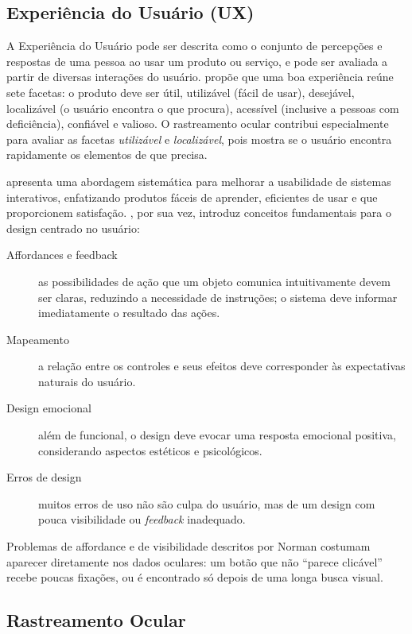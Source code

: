 \documentclass[sigconf, nonacm, language=english, language=portuguese, natbib=false]{acmart}
\begin{document}
\subsection{Experiência do Usuário (UX)}

A Experiência do Usuário pode ser descrita como o conjunto de percepções e respostas de uma pessoa ao usar um produto ou serviço, e pode ser avaliada a partir de diversas interações do usuário. \textcite{morville2004ux} propõe que uma boa experiência reúne sete facetas: o produto deve ser útil, utilizável (fácil de usar), desejável, localizável (o usuário encontra o que procura), acessível (inclusive a pessoas com deficiência), confiável e valioso. O rastreamento ocular contribui especialmente para avaliar as facetas \emph{utilizável} e \emph{localizável}, pois mostra se o usuário encontra rapidamente os elementos de que precisa.

\textcite{nielsen1993usability} apresenta uma abordagem sistemática para melhorar a usabilidade de sistemas interativos, enfatizando produtos fáceis de aprender, eficientes de usar e que proporcionem satisfação. \textcite{norman2002design}, por sua vez, introduz conceitos fundamentais para o design centrado no usuário:
\begin{description}
\item[Affordances e feedback] as possibilidades de ação que um objeto comunica intuitivamente devem ser claras, reduzindo a necessidade de instruções; o sistema deve informar imediatamente o resultado das ações.
\item[Mapeamento] a relação entre os controles e seus efeitos deve corresponder às expectativas naturais do usuário.
\item[Design emocional] além de funcional, o design deve evocar uma resposta emocional positiva, considerando aspectos estéticos e psicológicos.
\item[Erros de design] muitos erros de uso não são culpa do usuário, mas de um design com pouca visibilidade ou \emph{feedback} inadequado.
\end{description}
Problemas de affordance e de visibilidade descritos por Norman costumam aparecer diretamente nos dados oculares: um botão que não ``parece clicável'' recebe poucas fixações, ou é encontrado só depois de uma longa busca visual.

\subsection{Rastreamento Ocular}
\end{document}
